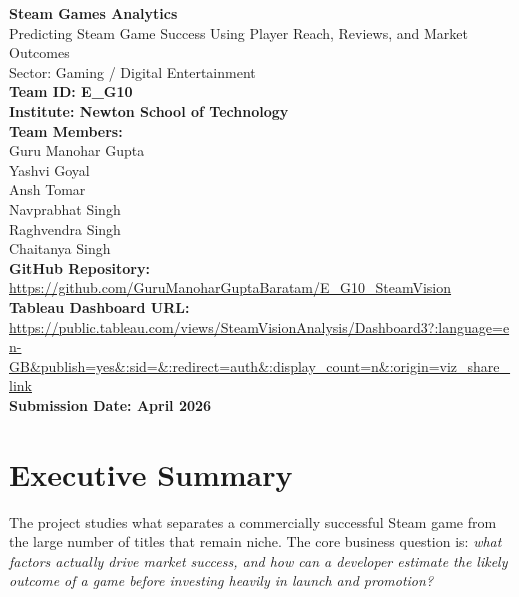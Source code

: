 \documentclass[12pt,a4paper]{report}
\begin{document}
\begin{titlepage}
\centering

{\Huge \textbf{Steam Games Analytics}}\\[0.5cm]
{\Large Predicting Steam Game Success Using Player Reach, Reviews, and Market Outcomes}\\[1.25cm]

{\large Sector: Gaming / Digital Entertainment}\\[0.5cm]

\textbf{Team ID: E\_G10}\\[0.5cm]
\textbf{Institute: Newton School of Technology}\\[1cm]

\textbf{Team Members:}\\
Guru Manohar Gupta \\
Yashvi Goyal \\
Ansh Tomar \\
Navprabhat Singh \\
Raghvendra Singh \\
Chaitanya Singh \\[1cm]

\textbf{GitHub Repository:}\\
\url{https://github.com/GuruManoharGuptaBaratam/E_G10_SteamVision}\\[0.5cm]

\textbf{Tableau Dashboard URL:}\\
\url{https://public.tableau.com/views/SteamVisionAnalysis/Dashboard3?:language=en-GB&publish=yes&:sid=&:redirect=auth&:display_count=n&:origin=viz_share_link}\\[1cm]

\textbf{Submission Date: April 2026}

\vfill
\end{titlepage}

\chapter*{Executive Summary}

The project studies what separates a commercially successful Steam game from the large number of titles that remain niche. The core business question is: \textit{what factors actually drive market success, and how can a developer estimate the likely outcome of a game before investing heavily in launch and promotion?}
\end{document}
